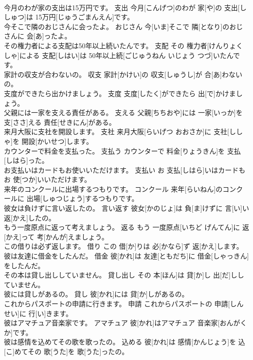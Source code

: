 \documentclass[8pt]{extreport}
\begin{document}
\begin{CJK}{UTF8}{min}
\\	今月のわが家の支出は15万円です。	支出	今月[こんげつ]のわが 家[や]の 支出[ししゅつ]は 15万円[じゅうごまんえん]です。	
\\	今そこで隣のおじさんに会ったよ。	おじさん	今[いま]そこで 隣[となり]のおじさんに 会[あ]ったよ。	
\\	その権力者による支配は50年以上続いたんです。	支配	その 権力者[けんりょくしゃ]による 支配[しはい]は 50年以上続[ごじゅうねん いじょう つづ]いたんです。	
\\	家計の収支が合わないの。	収支	家計[かけい]の 収支[しゅうし]が 合[あ]わないの。	
\\	支度ができたら出かけましょう。	支度	支度[したく]ができたら 出[で]かけましょう。	
\\	父親には一家を支える責任がある。	支える	父親[ちちおや]には 一家[いっか]を 支[ささ]える 責任[せきにん]がある。	
\\	来月大阪に支社を開設します。	支社	来月大阪[らいげつ おおさか]に 支社[ししゃ]を 開設[かいせつ]します。	
\\	カウンターで料金を支払った。	支払う	カウンターで 料金[りょうきん]を 支払[しはら]った。	
\\	お支払いはカードもお使いいただけます。	支払い	お 支払[しはら]いはカードもお 使[つか]いいただけます。	
\\	来年のコンクールに出場するつもりです。	コンクール	来年[らいねん]のコンクールに 出場[しゅつじょう]するつもりです。	
\\	彼女は負けずに言い返したの。	言い返す	彼女[かのじょ]は 負[ま]けずに 言[い]い 返[かえ]したの。	
\\	もう一度原点に返って考えましょう。	返る	もう 一度原点[いちど げんてん]に 返[かえ]って 考[かんが]えましょう。	
\\	この借りは必ず返します。	借り	この 借[か]りは 必[かなら]ず 返[かえ]します。	
\\	彼は友達に借金をしたんだ。	借金	彼[かれ]は 友達[ともだち]に 借金[しゃっきん]をしたんだ。	
\\	その本は貸し出ししていません。	貸し出し	その 本[ほん]は 貸[か]し 出[だ]ししていません。	
\\	彼には貸しがあるの。	貸し	彼[かれ]には 貸[か]しがあるの。	
\\	これからパスポートの申請に行きます。	申請	これからパスポートの 申請[しんせい]に 行[い]きます。	
\\	彼はアマチュア音楽家です。	アマチュア	彼[かれ]はアマチュア 音楽家[おんがくか]です。	
\\	彼は感情を込めてその歌を歌ったの。	込める	彼[かれ]は 感情[かんじょう]を 込[こ]めてその 歌[うた]を 歌[うた]ったの。	

\end{CJK}
\end{document}
